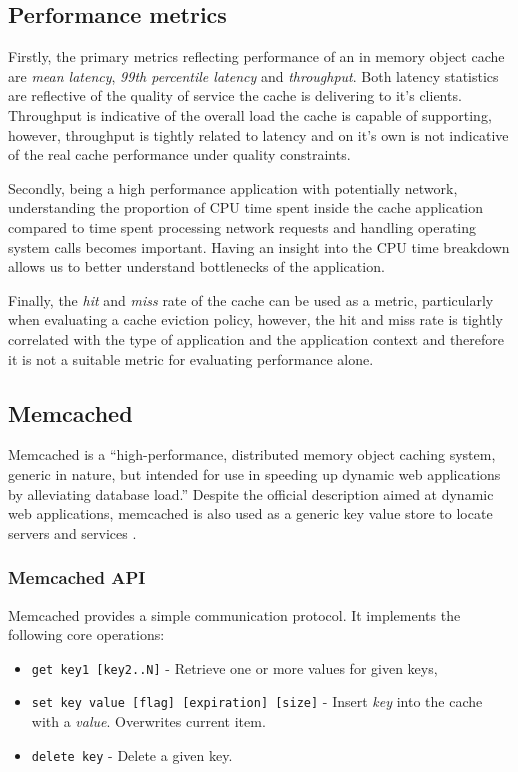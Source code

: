 \subsection{Performance metrics}
Firstly, the primary metrics reflecting performance of an in memory object cache are \textit{mean latency}, \textit{99th percentile latency} and \textit{throughput}. Both latency statistics are reflective of the quality of service the cache is delivering to it's clients. Throughput is indicative of the overall load the cache is capable of supporting, however, throughput is tightly related to latency and on it's own is not indicative of the real cache performance under quality constraints.

Secondly, being a high performance application with potentially network, understanding the proportion of CPU time spent inside the cache application compared to time spent processing network requests and handling operating system calls becomes important. Having an insight into the CPU time breakdown allows us to better understand bottlenecks of the application.

Finally, the \textit{hit} and \textit{miss} rate of the cache can be used as a metric, particularly when evaluating a cache eviction policy, however, the hit and miss rate is tightly correlated with the type of application and the application context and therefore it is not a suitable metric for evaluating performance alone.


\subsection{Memcached}

Memcached is a ``high-performance, distributed memory object caching system, generic in nature, but intended for use in speeding up dynamic web applications by alleviating database load.'' \cite{interactive2006memcached} Despite the official description aimed at dynamic web applications, memcached is also used as a generic key value store to locate servers and services \cite{atikoglu2012workload}.

\subsubsection{Memcached API}
Memcached provides a simple communication protocol. It implements the following core operations:

\begin{itemize}
    \item \texttt{get key1 [key2..N]} - Retrieve one or more values for given keys,
    \item \texttt{set key value [flag] [expiration] [size]} - Insert \textit{key} into the cache with a \textit{value}. Overwrites current item.
    \item \texttt{delete key} - Delete a given key.
\end{itemize}

